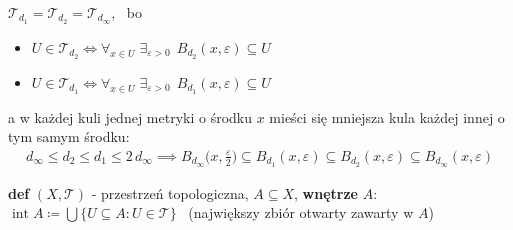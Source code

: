 \documentclass[a4paper,12pt]{article}
\begin{document}
\smallskip
\(\mathcal{T}_{d_1} = \mathcal{T}_{d_2} = \mathcal{T}_{d_\infty}\), \, bo
\begin{itemize}
    \item \(U \in \mathcal{T}_{d_2} \iff \forall_{x \in U} \; \exists_{\varepsilon > 0} \;\, B_{d_2}(x, \varepsilon) \subseteq U\)
    \item \(U \in \mathcal{T}_{d_1} \iff \forall_{x \in U} \; \exists_{\varepsilon > 0} \;\, B_{d_1}(x, \varepsilon) \subseteq U\)
\end{itemize}

\smallskip
a w każdej kuli jednej metryki o środku \(x\) mieści się mniejsza kula każdej innej o tym samym środku:
\begin{align*}
d_\infty \leq d_2 \leq d_1 \leq 2 \, d_\infty \implies B_{d_\infty}\big(x, \tfrac{\varepsilon}{2}\big) \subseteq B_{d_1}(x, \varepsilon) \subseteq B_{d_2}(x, \varepsilon) \subseteq B_{d_\infty}(x, \varepsilon)
\end{align*}

\bigskip
\textbf{def} \; \((X, \mathcal{T})\) - przestrzeń topologiczna, \; \(A \subseteq X\), \; \textbf{wnętrze} \(A\): \, \(\operatorname{int} A \coloneqq \bigcup \{U \subseteq A : U \in \mathcal{T}\}\) \, (największy zbiór otwarty zawarty w \(A\))
\end{document}
